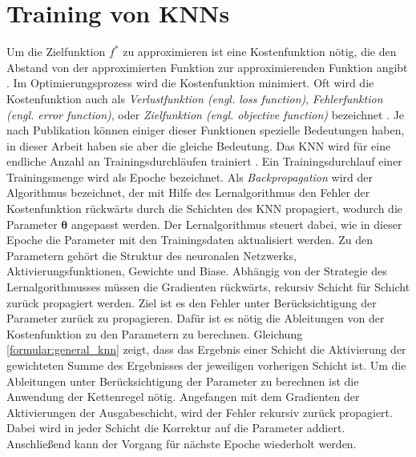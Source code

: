 \section{Training von KNNs}
Um die Zielfunktion $f^{*}$ zu approximieren ist eine Kostenfunktion nötig, die den Abstand von der approximierten Funktion zur approximierenden Funktion angibt \cite{nielsenneural}.
Im Optimierungsprozess wird die Kostenfunktion minimiert. 
Oft wird die Kostenfunktion auch als \textit{Verlustfunktion (engl. loss function)}, \textit{Fehlerfunktion (engl. error function)},
oder \textit{Zielfunktion (engl. objective function)} bezeichnet \cite{bengio2017deep}.
Je nach Publikation können einiger dieser Funktionen spezielle Bedeutungen haben, in dieser Arbeit haben sie aber die gleiche Bedeutung.
\newline
\newline
Das KNN wird für eine endliche Anzahl an Trainingsdurchläufen trainiert \cite{nielsenneural}.
Ein Trainingsdurchlauf einer Trainingsmenge wird als Epoche bezeichnet.
Als \textit{Backpropagation} wird der Algorithmus bezeichnet, der mit Hilfe des Lernalgorithmus den Fehler der
Kostenfunktion rückwärts durch die Schichten des KNN propagiert, wodurch die Parameter $\boldsymbol\theta$ angepasst werden.
Der Lernalgorithmus steuert dabei, wie in dieser Epoche die Parameter mit den Trainingsdaten aktualisiert werden.
Zu den Parametern gehört die Struktur des neuronalen Netzwerks, Aktivierungsfunktionen, Gewichte und Biase.
\newline
\newline
Abhängig von der Strategie des Lernalgorithmusses müssen die Gradienten rückwärts, rekursiv Schicht für Schicht zurück propagiert werden.
Ziel ist es den Fehler unter Berücksichtigung der Parameter zurück zu propagieren.
Dafür ist es nötig die Ableitungen von der Kostenfunktion zu den Parametern zu berechnen.
Gleichung \ref{formular:general_knn} zeigt, dass das Ergebnis einer Schicht die Aktivierung der gewichteten Summe des
Ergebnisses der jeweiligen vorherigen Schicht ist.
Um die Ableitungen unter Berücksichtigung der Parameter zu berechnen ist die Anwendung der Kettenregel nötig.
\newline
\newline
Angefangen mit dem Gradienten der Aktivierungen der Ausgabeschicht, wird der Fehler rekursiv zurück propagiert.
Dabei wird in jeder Schicht die Korrektur auf die Parameter addiert.
Anschließend kann der Vorgang für nächste Epoche wiederholt werden.